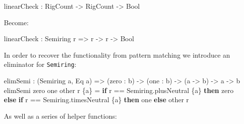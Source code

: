 \documentclass[
]{article}
\newenvironment{Shaded}{}{}
\newcommand{\DataTypeTok}[1]{\textcolor[rgb]{0.56,0.13,0.00}{#1}}
\newcommand{\KeywordTok}[1]{\textcolor[rgb]{0.00,0.44,0.13}{\textbf{#1}}}
\newcommand{\NormalTok}[1]{#1}
\newcommand{\OperatorTok}[1]{\textcolor[rgb]{0.40,0.40,0.40}{#1}}
\newcommand{\OtherTok}[1]{\textcolor[rgb]{0.00,0.44,0.13}{#1}}
\begin{document}
\begin{Shaded}
\begin{Highlighting}[]
\NormalTok{linearCheck }\OperatorTok{:} \DataTypeTok{RigCount} \OtherTok{{-}\textgreater{}} \DataTypeTok{RigCount} \OtherTok{{-}\textgreater{}} \DataTypeTok{Bool}
\end{Highlighting}
\end{Shaded}

Become:

\begin{Shaded}
\begin{Highlighting}[]
\NormalTok{linearCheck }\OperatorTok{:} \DataTypeTok{Semiring}\NormalTok{ r }\OtherTok{=\textgreater{}}\NormalTok{ r }\OtherTok{{-}\textgreater{}}\NormalTok{ r }\OtherTok{{-}\textgreater{}} \DataTypeTok{Bool}
\end{Highlighting}
\end{Shaded}

In order to recover the functionality from pattern matching we introduce
an eliminator for \texttt{Semiring}:

\begin{Shaded}
\begin{Highlighting}[]
\NormalTok{elimSemi }\OperatorTok{:}\NormalTok{ (}\DataTypeTok{Semiring}\NormalTok{ a, }\DataTypeTok{Eq}\NormalTok{ a) }\OtherTok{=\textgreater{}}\NormalTok{ (zero }\OperatorTok{:}\NormalTok{ b) }\OtherTok{{-}\textgreater{}}\NormalTok{ (one }\OperatorTok{:}\NormalTok{ b) }\OtherTok{{-}\textgreater{}}\NormalTok{ (a }\OtherTok{{-}\textgreater{}}\NormalTok{ b) }\OtherTok{{-}\textgreater{}}\NormalTok{ a }\OtherTok{{-}\textgreater{}}\NormalTok{ b}
\NormalTok{elimSemi zero one other r \{a\} }\OtherTok{=}
  \KeywordTok{if}\NormalTok{ r }\OperatorTok{==}\NormalTok{ Semiring.plusNeutral \{a\}}
     \KeywordTok{then}\NormalTok{ zero}
     \KeywordTok{else} \KeywordTok{if}\NormalTok{ r }\OperatorTok{==}\NormalTok{ Semiring.timesNeutral \{a\}}
             \KeywordTok{then}\NormalTok{ one}
             \KeywordTok{else}\NormalTok{ other r}
\end{Highlighting}
\end{Shaded}

As well as a series of helper functions:
\end{document}
